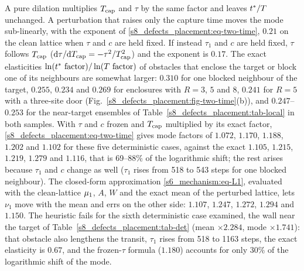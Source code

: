 A pure dilation multiplies $T_{\mathrm{cap}}$ and $\tau$ by the same factor and leaves $t^{*}/T$ unchanged. A perturbation
that raises only the capture time moves the mode sub-linearly, with the exponent of
\eqref{s8_defects_placement:eq-two-time}, $0.21$ on the clean lattice when $\tau$ and $c$ are held fixed. If instead
$\tau_1$ and $c$ are held fixed, $\tau$ follows $T_{\mathrm{cap}}$ ($\mathrm{d}\tau/\mathrm{d}T_{\mathrm{cap}}=-\tau^{2}/T_{\mathrm{cap}}^{2}$) and the exponent is
$0.17$.
The exact elasticities $\ln(\tmode\ \text{factor})/\ln(\MF\ \text{factor})$ of obstacles that enclose the target
or block one of its neighbours are
somewhat larger: $0.310$ for one blocked neighbour of the target, $0.255$, $0.234$ and $0.269$ for enclosures
with $R=3$, $5$ and $8$, $0.241$ for $R=5$ with a three-site door
(Fig.~\ref{s8_defects_placement:fig-two-time}(b)), and $0.247$--$0.253$ for the near-target ensembles of
Table~\ref{s8_defects_placement:tab-local} in both samples.
With $\tau$ and $c$ frozen and $T_{\mathrm{cap}}$ multiplied by its exact factor, \eqref{s8_defects_placement:eq-two-time}
gives mode factors of $1.072$, $1.170$, $1.188$, $1.202$ and $1.102$ for these five deterministic cases, against
the exact $1.105$, $1.215$, $1.219$, $1.279$ and $1.116$, that is 69--88\% of the logarithmic shift; the rest
arises because $\tau_1$ and $c$ change as well ($\tau_1$ rises from 518 to 543 steps for one blocked neighbour).
The closed-form approximation \eqref{s6_mechanism:eq-L1}, evaluated with the clean-lattice $\mu_{1}$, $A$, $W$ and
the exact mean of the perturbed lattice, lets $\nu_1$ move with the mean and errs on the other side: $1.107$,
$1.247$, $1.272$, $1.294$ and $1.150$.
The heuristic fails for the sixth deterministic case examined, the wall near the target of
Table~\ref{s8_defects_placement:tab-det} (mean $\times2.284$, mode $\times1.741$): that obstacle also lengthens the
transit, $\tau_1$ rises from 518 to 1163 steps, the exact elasticity is $0.67$, and the frozen-$\tau$ formula
($1.180$) accounts for only $30\%$ of the logarithmic shift of the mode.

